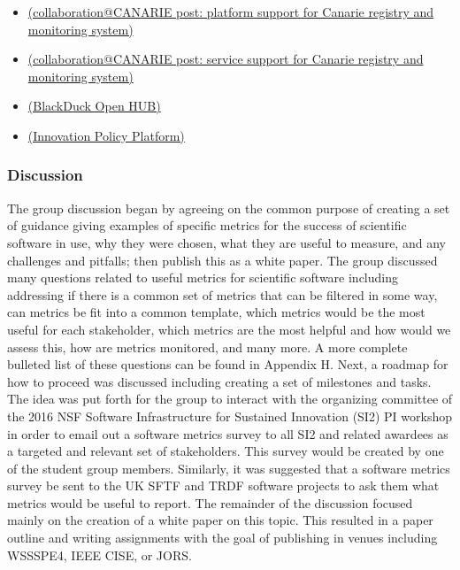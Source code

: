 \begin{itemize}
\item
\href{https://collaboration.canarie.ca/elgg/file/view/2471/research-platform-support-for-the-canarie-registry-and-monitoring-system-revision-3}{(collaboration@CANARIE post: platform support for Canarie registry and monitoring system)}

\item
\href{https://collaboration.canarie.ca/elgg/file/view/2453/research-service-support-for-canarie-registry-and-monitoring-system-revision-7}{(collaboration@CANARIE post: service support for Canarie registry and monitoring system)}

\item
\href{https://www.openhub.net/}{(BlackDuck Open HUB)}

\item
\href{https://www.innovationpolicyplatform.org/frontpage}{(Innovation Policy Platform)}


\end{itemize}



\subsubsection{Discussion}

The group discussion began by agreeing on the common purpose of creating a set of guidance giving examples of specific metrics for the success of scientific software in use, why they were chosen, what they are useful to measure, and any challenges and pitfalls; then publish this as a white paper.  The group discussed many questions related to useful metrics for scientific software including addressing if there is a common set of metrics that can be filtered in some way, can metrics be fit into a common template, which metrics would be the most useful for each stakeholder, which metrics are the most helpful and how would we assess this, how are metrics monitored, and many more.  A more complete bulleted list of these questions can be found in Appendix H.  Next, a roadmap for how to proceed was discussed including creating a set of milestones and tasks.  The idea was put forth for the group to interact with the organizing committee of the 2016 NSF Software Infrastructure for Sustained Innovation (SI2) PI workshop in order to email out a software metrics survey to all SI2 and related awardees as a targeted and relevant set of stakeholders.  This survey would be created by one of the student group members.  Similarly, it was suggested that a software metrics survey be sent to the UK SFTF and TRDF software projects to ask them what metrics would be useful to report.  The remainder of the discussion focused mainly on the creation of a white paper on this topic.  This resulted in a paper outline and writing assignments with the goal of publishing in venues including WSSSPE4, IEEE CISE, or JORS.

